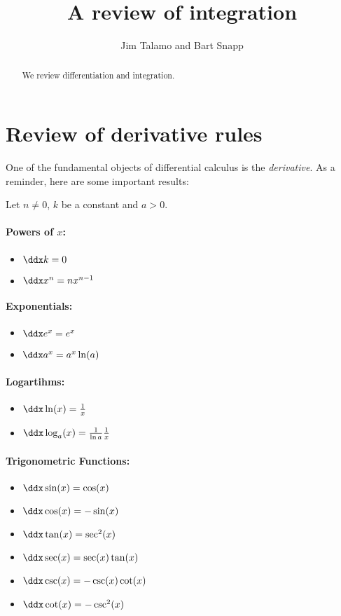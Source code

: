 \documentclass[nooutcomes]{ximera}
\author{Jim Talamo and Bart Snapp}
\title[Dig-In:]{A review of integration}
\begin{document}
\begin{abstract}
  We review differentiation and integration.
\end{abstract}
\maketitle


\section{Review of derivative rules}

One of the fundamental objects of differential calculus is the \emph{derivative}.  As a reminder, here are some important results:

  Let $n\ne 0$, $k$ be a constant and $a>0$.


\paragraph{Powers of $x$:}
\begin{itemize}
\item $\ddx k =0$
\item $\ddx x^n  = n x^{n-1}$
\end{itemize}

\paragraph{Exponentials:}
\begin{itemize}
\item $\ddx e^x = e^x$
\item $\ddx a^x = a^x\ln(a)$
\end{itemize}

\paragraph{Logartihms:}
\begin{itemize}
\item $\ddx \ln(x) = \frac{1}{x}$
\item $\ddx \log_a (x) = \frac{1}{\ln a} \frac{1}{x}$
\end{itemize}

\paragraph{Trigonometric Functions:}
\begin{itemize}
\item $\ddx \sin(x) = \cos(x)$
\item $\ddx \cos(x) = -\sin(x)$  
\item $\ddx \tan(x) = \sec^2(x)$  
\item $\ddx \sec(x) = \sec(x)\tan(x)$ 
\item $\ddx \csc(x) = -\csc(x)\cot(x)$
\item $\ddx \cot(x) = -\csc^2(x)$
\end{itemize}
\end{document}
